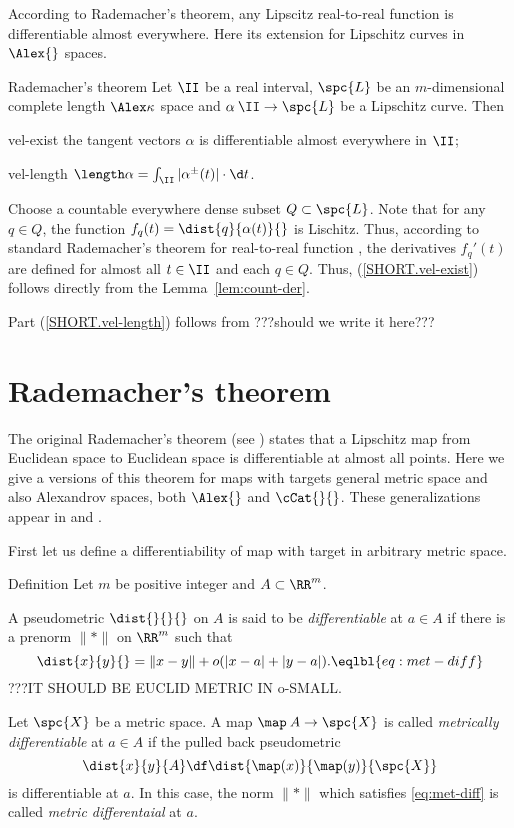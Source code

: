 According to Rademacher's theorem, any Lipscitz real-to-real function is differentiable almost everywhere. Here its extension for Lipschitz curves in $\Alex{}$ spaces.

\begin{thm}{Rademacher's theorem}\label{thm:velocity}
Let $\II$ be a real interval, $\spc{L}$ be an $m$-dimensional complete length $\Alex\kappa$ space
and $\alpha\:\II\to \spc{L}$ be a Lipschitz curve.
Then 

\begin{subthm}{vel-exist} the tangent vectors $\alpha$ is differentiable almost everywhere in $\II$;
\end{subthm}

\begin{subthm}{vel-length}
$\length\alpha=\int_{\II}|\alpha^\pm(t)|\cdot\d t$.
\end{subthm}

\end{thm}

Choose a countable everywhere dense subset $Q\subset \spc{L}$.
Note that for any $q\in Q$, the function $f_q(t)=\dist{q}{\alpha(t)}{}$ is Lischitz.
Thus, according to standard Rademacher's theorem for real-to-real function \cite[3.1.6]{federer}, the derivatives $f_q'(t)$ are defined for almost all $t\in\II$ and each $q\in Q$.
Thus, (\ref{SHORT.vel-exist}) follows directly from the Lemma~\ref{lem:count-der}.

Part (\ref{SHORT.vel-length}) follows from \cite[2.7.4]{BBI}
???should we write it here???
\qeds

\section{Rademacher's theorem}

The original Rademacher's theorem (see \cite[3.1.6]{federer})
states that a Lipschitz map from Euclidean space to Euclidean space is differentiable at almost all points.
Here we give a versions of this theorem for maps with targets
general metric space
and also Alexandrov spaces, both $\Alex{}$ and $\cCat{}{}$.
These generalizations appear in \cite{kirchheim} and \cite{lytchak:diff}.

First let us define a differentiability of map 
with target in arbitrary metric space.

\begin{thm}{Definition}
Let $m$ be positive integer and $A\subset \RR^m$.

A pseudometric $\dist{}{}{}$ on $A$ is said to be \emph{differentiable}
at $a\in A$ if there is a prenorm $\|{*}\|$ on $\RR^m$ such that
\[\dist{x}{y}{}=\|x-y\|+o(|x-a|+|y-a|).
\eqlbl{eq:met-diff}\]
???IT SHOULD BE EUCLID METRIC IN o-SMALL.

Let $\spc{X}$ be a metric space.
A map $\map\:A\to\spc{X}$ is called \emph{metrically differentiable} at $a\in A$ if the pulled back pseudometric 
\[\dist{x}{y}{A}
\df
\dist{\map(x)}{\map(y)}{\spc{X}}\]
is differentiable at $a$.
In this case, the norm $\|{*}\|$ which satisfies \ref{eq:met-diff} is called \emph{metric differentaial} at $a$.
\end{thm}

